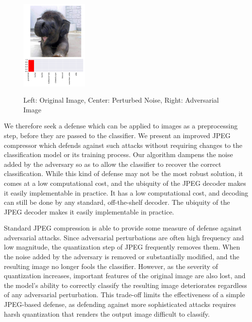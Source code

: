 \begin{figure}[H]
     \includegraphics[width=0.30\textwidth,angle=0]{figures/protect/adv.pdf}
     \label{fig:adv}
      \caption[Qualitative comparison of Adversarial Images]{Left: Original Image, Center: Perturbed Noise, Right: Adversarial Image}
 \end{figure}


We therefore seek a defense which can be applied to images as a preprocessing step, before they are passed to the classifier.
We present an improved JPEG compressor which defends against such attacks without requiring changes to the classification model or its training process.
Our algorithm dampens the noise added by the adversary so as to allow the classifier to recover the correct classification.
While this kind of defense may not be the most robust solution, it comes at a low computational cost, and the ubiquity of the JPEG decoder makes it easily implementable in practice.
It has a low computational cost, and decoding can still be done by any standard, off-the-shelf decoder.
The ubiquity of the JPEG decoder makes it easily implementable in practice.


Standard JPEG compression is able to provide some measure of defense against adversarial attacks.
Since adversarial perturbations are often high frequency and low magnitude, the quantization step of JPEG frequently removes them.
When the noise added by the adversary is removed or substantially modified, and the resulting image no longer fools the classifier.
However, as the severity of quantization increases, important features of the original image are also lost, and the model's ability to correctly classify the resulting image deteriorates regardless of any adversarial perturbation.
This trade-off limits the effectiveness of a simple JPEG-based defense, as defending against more sophisticated attacks requires harsh quantization that renders the output image difficult to classify.

